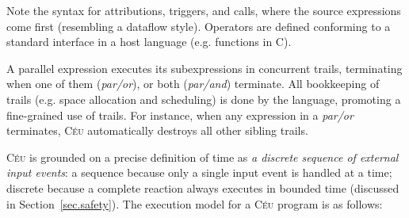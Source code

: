 \documentclass[10pt]{sigplan-proc-varsize-sensys11}
\newcommand{\2}{\;\;}
\newcommand{\5}{\;\;\;\;\;}
\newcommand{\til}{$\thicksim$}
\newcommand{\brk}{\textbf{\small{$^\wedge$}}}
\newcommand{\CEU}{\textsc{C\'{e}u}}
\begin{document}
Note the syntax for attributions, triggers, and calls, where the source 
expressions come first (resembling a dataflow style).
Operators are defined conforming to a standard interface in a host language 
(e.g. functions in C).

A parallel expression executes its subexpressions in concurrent trails, 
terminating when one of them (\emph{par/or}), or both (\emph{par/and}) 
terminate.
All bookkeeping of trails (e.g. space allocation and scheduling) is done by the 
language, promoting a fine-grained use of trails.
For instance, when any expression in a \emph{par/or} terminates, \CEU{} 
automatically destroys all other sibling trails.

\CEU{} is grounded on a precise definition of time as \emph{a discrete sequence 
of external input events}: a sequence because only a single input event is 
handled at a time; discrete because a complete reaction always executes in 
bounded time (discussed in Section~\ref{sec.safety}).
The execution model for a \CEU{} program is as follows:
\end{document}
